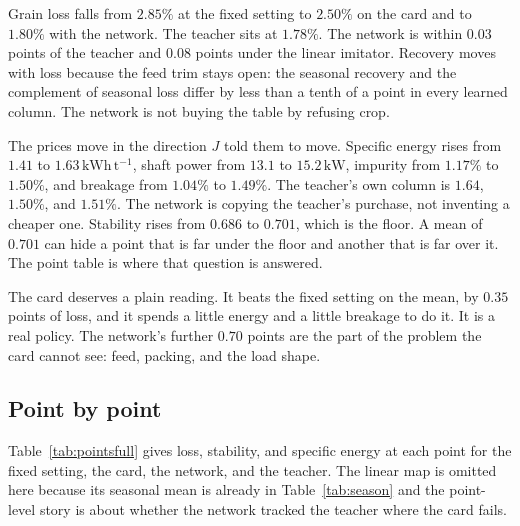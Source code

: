 Grain loss falls from \(2.85\%\) at the fixed setting to \(2.50\%\) on the card and to \(1.80\%\) with the network. The teacher sits at \(1.78\%\). The network is within \(0.03\) points of the teacher and \(0.08\) points under the linear imitator. Recovery moves with loss because the feed trim stays open: the seasonal recovery and the complement of seasonal loss differ by less than a tenth of a point in every learned column. The network is not buying the table by refusing crop.

The prices move in the direction \(J\) told them to move. Specific energy rises from \(1.41\) to \(1.63\,\mathrm{kWh\,t^{-1}}\), shaft power from \(13.1\) to \(15.2\,\mathrm{kW}\), impurity from \(1.17\%\) to \(1.50\%\), and breakage from \(1.04\%\) to \(1.49\%\). The teacher's own column is \(1.64\), \(1.50\%\), and \(1.51\%\). The network is copying the teacher's purchase, not inventing a cheaper one. Stability rises from \(0.686\) to \(0.701\), which is the floor. A mean of \(0.701\) can hide a point that is far under the floor and another that is far over it. The point table is where that question is answered.

The card deserves a plain reading. It beats the fixed setting on the mean, by \(0.35\) points of loss, and it spends a little energy and a little breakage to do it. It is a real policy. The network's further \(0.70\) points are the part of the problem the card cannot see: feed, packing, and the load shape.

\subsection{Point by point}

Table~\ref{tab:pointsfull} gives loss, stability, and specific energy at each point for the fixed setting, the card, the network, and the teacher. The linear map is omitted here because its seasonal mean is already in Table~\ref{tab:season} and the point-level story is about whether the network tracked the teacher where the card fails.

